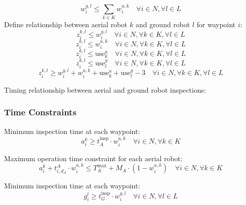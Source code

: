 \documentclass{article}
\begin{document}
				\begin{equation}
				w_i^{g,l} \leq \sum_{k \in K} w_i^{a,k} \quad \forall i \in N, \forall l \in L
				\end{equation}
				Define relationship between aerial robot $k$ and ground robot $l$ for waypoint $i$:
				\begin{equation}
				z_i^{k,l} \leq w_i^{g,l} \quad \forall i \in N, \forall k \in K, \forall l \in L
				\end{equation}
				\begin{equation}
				z_i^{k,l} \leq w_i^{a,k} \quad \forall i \in N, \forall k \in K, \forall l \in L
				\end{equation}
				\begin{equation}
				z_i^{k,l} \leq \text{use}_k^a \quad \forall i \in N, \forall k \in K, \forall l \in L
				\end{equation}
				\begin{equation}
				z_i^{k,l} \leq \text{use}_l^g \quad \forall i \in N, \forall k \in K, \forall l \in L
				\end{equation}
				\begin{equation}
				z_i^{k,l} \geq w_i^{g,l} + w_i^{a,k} + \text{use}_k^a + \text{use}_l^g - 3 \quad \forall i \in N, \forall k \in K, \forall l \in L
				\end{equation}

				Timing relationship between aerial and ground robot inspections:

			\subsubsection{Time Constraints}

				Minimum inspection time at each waypoint:
				\begin{equation}
				a_i^k \geq t_A^{\text{insp}} \cdot w_i^{a,k} \quad \forall i \in N, \forall k \in K
				\end{equation}

				Maximum operation time constraint for each aerial robot:
				\begin{equation}
				a_i^k + t_{i,d_A}^{A} \cdot w_i^{a,k} \leq T_A^{\max} + M_A \cdot (1 - w_i^{a,k}) \quad \forall i \in N, \forall k \in K
				\end{equation}

				Minimum inspection time at each waypoint:
				\begin{equation}
				g_i^l \geq t_G^{\text{insp}} \cdot w_i^{g,l} \quad \forall i \in N, \forall l \in L
				\end{equation}
\end{document}
